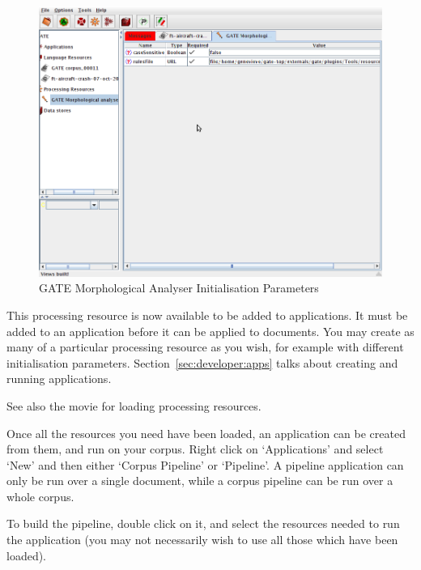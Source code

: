 \begin{figure}[htb]
\begin{center}
\includegraphics[scale=0.5]{pr-init-params.png}
\end{center}
\caption{GATE Morphological Analyser Initialisation Parameters}
\label{fig:pr-init-params}
\end{figure}

This processing resource is now available to be added to applications. It must
be added to an application before it can be applied to documents. You may
create as many of a particular processing resource as you wish, for example
with different initialisation parameters. Section~\ref{sec:developer:apps}
talks about creating and running applications.

See also the 
{movie for loading processing resources}.


Once all the resources you need have been loaded, an application can be created
from them, and run on your corpus. Right click on `Applications' and select `New'
and then either `Corpus Pipeline' or `Pipeline'. A pipeline application can only
be run over a single document, while a corpus pipeline can be run over a whole
corpus.

To build the pipeline, double click on it, and select the resources needed
to run the application (you may not necessarily wish to use all those
which have been loaded).

